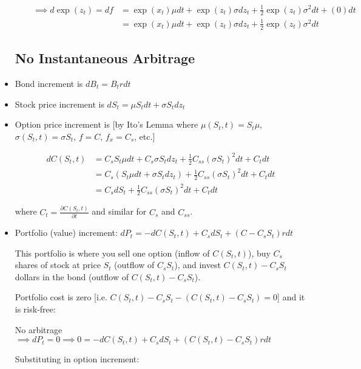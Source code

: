 \documentclass{article}
\begin{document}
\begin{itemize}
\begin{itemize}
\begin{align*}
\implies d \exp (z_t) = df 
&= \exp(x_t) \mu dt + \exp(z_t) \sigma dz_t + \frac{1}{2} \exp(z_t) \sigma^2 dt + (0) dt\\
&= \exp(x_t) \mu dt + \exp(z_t) \sigma dz_t + \frac{1}{2} \exp(z_t) \sigma^2 dt
\end{align*}


\end{itemize}

\subsection*{No Instantaneous Arbitrage}

\item Bond increment is $dB_t = B_t r dt$

\item Stock price increment is $dS_t = \mu S_t dt + \sigma S_t dz_t$

\item Option price increment is [by Ito's Lemma where $\mu(S_t, t) = S_t \mu$, $\sigma(S_t, t) = \sigma S_t$, $f = C$, $f_x =C_s$, etc.]

\begin{align*}
d C(S_t, t) 
&= C_s S_t \mu dt + C_s \sigma S_t dz_t + \frac{1}{2} C_{ss} (\sigma S_t)^2 dt + C_t dt\\
&= C_s (S_t \mu dt +  \sigma S_t dz_t) + \frac{1}{2} C_{ss} (\sigma S_t)^2 dt + C_t dt\\
&= C_s dS_t + \frac{1}{2} C_{ss} (\sigma S_t)^2 dt + C_t dt
\end{align*}

where $C_t = \frac{\partial C(S_t, t)}{\partial t}$ and similar for $C_s$ and $C_{ss}$.

\item Portfolio (value) increment: $dP_t = -dC(S_t, t) + C_s dS_t + (C - C_s S_t)rdt$

This portfolio is where you sell one option (inflow of $C(S_t, t)$), buy $C_s$ shares of stock at price $S_t$ (outflow of $C_s S_t$), and invest $C(S_t, t) - C_s S_t$ dollars in the bond (outflow of $C(S_t, t) - C_s S_t$).

Portfolio cost is zero [i.e. $C(S_t, t) - C_s S_t - (C(S_t, t) - C_s S_t) = 0$] and it is risk-free: 

No arbitrage $\implies dP_t = 0 \implies 0 = -dC(S_t, t) + C_s dS_t + (C(S_t, t) - C_s S_t)rdt$

Substituting in option increment:


\end{itemize}
\end{document}
